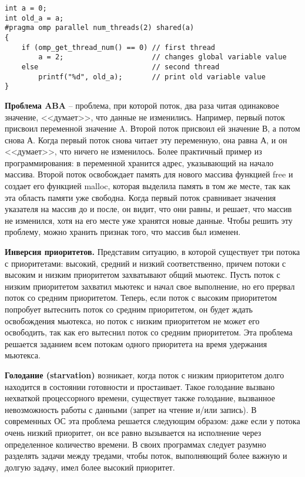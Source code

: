 \begin{verbatim}
int a = 0;
int old_a = a;
#pragma omp parallel num_threads(2) shared(a)
{
    if (omp_get_thread_num() == 0) // first thread 
        a = 2;                     // changes global variable value
    else                           // second thread 
        printf("%d", old_a);       // print old variable value
}
\end{verbatim}

\textbf{Проблема ABA} -- проблема, при которой поток, два раза читая одинаковое значение, <<думает>>, что данные не изменились. Например, первый поток присвоил переменной значение A. Второй поток присвоил ей значение В, а потом снова А. Когда первый поток снова читает эту переменную, она равна А, и он <<думает>>, что ничего не изменилось. Более практичный пример из программирования: в переменной хранится адрес, указывающий на начало массива. Второй поток освобождает память для нового массива функцией free и создает его функцией malloc, которая выделила память в том же месте, так как эта область памяти уже свободна. Когда первый поток сравнивает значения указателя на массив до и после, он видит, что они равны, и решает, что массив не изменился, хотя на его месте уже хранятся новые данные. Чтобы решить эту проблему, можно хранить признак того, что массив был изменен.

\textbf{Инверсия приоритетов.} Представим ситуацию, в которой существует три потока с приоритетами: высокий, средний и низкий соответственно, причем потоки с высоким и низким приоритетом захватывают общий мьютекс. Пусть поток с низким приоритетом захватил мьютекс и начал свое выполнение, но его прервал поток со средним приоритетом. Теперь, если поток с высоким приоритетом попробует вытеснить поток со средним  приоритетом, он будет ждать освобождения мьютекса, но поток с низким приоритетом не может его освободить, так как его вытеснил поток со средним приоритетом. Эта проблема решается заданием всем потокам одного приоритета на время удержания мьютекса.

\textbf{Голодание (starvation)} возникает, когда поток с низким приоритетом долго находится в состоянии готовности и простаивает. Такое голодание вызвано нехваткой процессорного времени, существует также голодание, вызванное невозможность работы с данными (запрет на чтение и/или запись). В современных ОС эта проблема решается следующим образом: даже если у потока очень низкий приоритет, он все равно вызывается на исполнение через определенное количество времени. В своих программах следует разумно разделять задачи между тредами, чтобы поток, выполняющий более важную и долгую задачу, имел более высокий приоритет.

